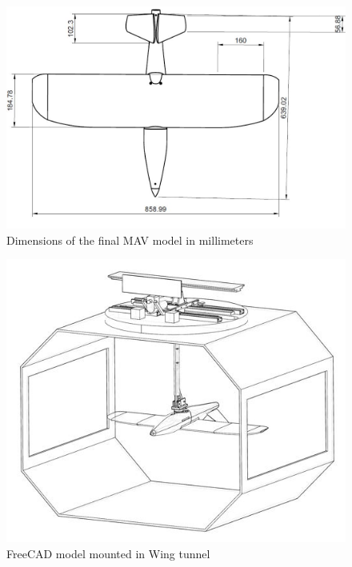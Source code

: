\begin{figure}
    \centering
    \includegraphics{04_Methodology/Figs/dimensions.JPG}
    
    \caption{Dimensions of the final \acrshort{MAV} model in millimeters}
    \label{fig:dimension22}
\end{figure}





\begin{figure}
    \centering
    \includegraphics{04_Methodology/Figs/ModelWithtunnel.JPG}
    \caption{FreeCAD model mounted in Wing tunnel }
    \label{fig:modelWithTunnel}
\end{figure}

